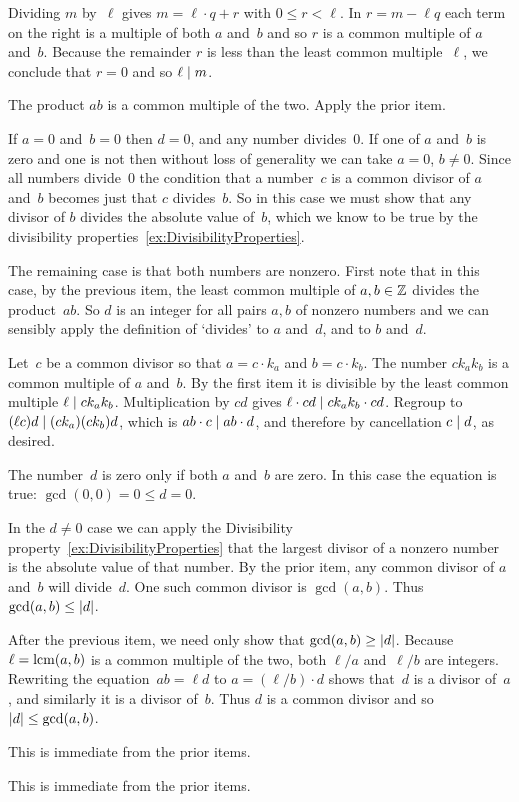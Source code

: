 \documentclass{ibl}  %
\begin{document}
\begin{euclidproof}
\begin{ex}
\begin{ans}
\begin{exes}
  Dividing $m$ by~$\ell$ gives 
  $m=\ell\cdot q+r$ with $0\leq r< \ell$.
  In $r=m-\ell q$ 
  each term on the right is a multiple
  of both $a$ and~$b$ and so 
  $r$ is a common multiple of $a$ and~$b$.
  Because the remainder $r$ is less than the least common multiple~$\ell$,
  we conclude that $r=0$ and so $\ell\mid m$.
\item The product $ab$ is a common multiple of the two.
  Apply the prior item.
\item If $a=0$ and~$b=0$ then $d=0$, and any number divides~$0$.
  If one of $a$ and~$b$ is zero and one is not then without loss of generality
  we can take $a=0$, $b\neq 0$.
  Since all numbers divide~$0$ the condition that a number~$c$ 
  is a common divisor of $a$ and~$b$
  becomes just that $c$ divides~$b$.
  So in this case we must show that any divisor of $b$ divides the 
  absolute value of~$b$, which we know to be true by the divisibility 
  properties~\ref{ex:DivisibilityProperties}.

  The remaining case is that both numbers are nonzero.
  First note that in this case,
  by the previous item, the least common multiple of $a,b\in\mathbb{Z}$ divides
  the product~$ab$.
  So $d$ is an integer for all pairs $a,b$ of nonzero numbers
  and we can sensibly apply the definition of `divides' to
  $a$ and~$d$, and to $b$ and~$d$.
  
  Let~$c$ be a common divisor so that $a=c\cdot k_a$ and $b=c\cdot k_b$.
  The number $ck_ak_b$ is a common multiple of $a$ and~$b$. 
  By the first item it is divisible by the least common multiple  
  $\ell\mid ck_ak_b$.
  Multiplication by $cd$ gives $\ell\cdot cd\mid ck_ak_b\cdot cd$.
  Regroup to $(\ell c)d\mid (ck_a)(ck_b)d$, which is
  $ab\cdot c\mid ab\cdot d$, and therefore by cancellation $c\mid d$,
  as desired.
\item The number~$d$ is zero only if both $a$ and~$b$ are
  zero.
  In this case the equation is true: $\gcd(0,0)=0\leq d=0$.

  In the $d\neq 0$ case we can apply the 
  Divisibility property~\ref{ex:DivisibilityProperties} that the
  largest divisor of a nonzero number is the absolute value of that number.
  By the prior item, any common divisor of $a$ and~$b$ will divide~$d$.
  One such common divisor is $\gcd(a,b)$.
  Thus $\gcd(a,b)\leq\lvert d\rvert$.
\item
  After the previous item, we need only show that $\gcd(a,b)\geq\lvert d\rvert$. 
  Because $\ell=\operatorname{lcm}(a,b)$ is a common multiple of the two, 
  both $\ell/a$ and~$\ell/b$ are integers. 
  Rewriting the equation~$ab=\ell d$ to 
  $a=(\ell/b)\cdot d$ shows that~$d$ is a divisor of~$a$, and similarly
  it is a divisor of~$b$.
  Thus $d$ is a common divisor and so $\lvert d\rvert\leq \gcd(a,b)$.
\item This is immediate from the prior items.
\item This is immediate from the prior items.
\end{exes}
\end{ans}
\end{ex}


\end{euclidproof}
\end{document}
